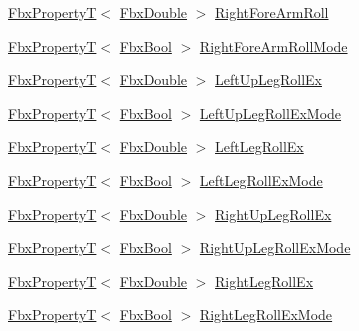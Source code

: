\begin{DoxyCompactItemize}
\item 
\hyperlink{class_fbx_property_t}{Fbx\+PropertyT}$<$ \hyperlink{fbxtypes_8h_a171e72a1c46fc15c1a6c9c31948c1c5b}{Fbx\+Double} $>$ \hyperlink{class_fbx_character_ae212ac3d99f7c69142bb4abc561c1c99}{Right\+Fore\+Arm\+Roll}
\item 
\hyperlink{class_fbx_property_t}{Fbx\+PropertyT}$<$ \hyperlink{fbxtypes_8h_a92e0562b2fe33e76a242f498b362262e}{Fbx\+Bool} $>$ \hyperlink{class_fbx_character_ada8eaa6dbd3161bfbb6a057116364d55}{Right\+Fore\+Arm\+Roll\+Mode}
\item 
\hyperlink{class_fbx_property_t}{Fbx\+PropertyT}$<$ \hyperlink{fbxtypes_8h_a171e72a1c46fc15c1a6c9c31948c1c5b}{Fbx\+Double} $>$ \hyperlink{class_fbx_character_a8e89a70dc082f417658819afb9dc5299}{Left\+Up\+Leg\+Roll\+Ex}
\item 
\hyperlink{class_fbx_property_t}{Fbx\+PropertyT}$<$ \hyperlink{fbxtypes_8h_a92e0562b2fe33e76a242f498b362262e}{Fbx\+Bool} $>$ \hyperlink{class_fbx_character_a4e769bc27457b215a8c2290bb3800b01}{Left\+Up\+Leg\+Roll\+Ex\+Mode}
\item 
\hyperlink{class_fbx_property_t}{Fbx\+PropertyT}$<$ \hyperlink{fbxtypes_8h_a171e72a1c46fc15c1a6c9c31948c1c5b}{Fbx\+Double} $>$ \hyperlink{class_fbx_character_a2af8b40afb59381a80e02b2046997e93}{Left\+Leg\+Roll\+Ex}
\item 
\hyperlink{class_fbx_property_t}{Fbx\+PropertyT}$<$ \hyperlink{fbxtypes_8h_a92e0562b2fe33e76a242f498b362262e}{Fbx\+Bool} $>$ \hyperlink{class_fbx_character_af932f9843a39519efa5d93731e61a601}{Left\+Leg\+Roll\+Ex\+Mode}
\item 
\hyperlink{class_fbx_property_t}{Fbx\+PropertyT}$<$ \hyperlink{fbxtypes_8h_a171e72a1c46fc15c1a6c9c31948c1c5b}{Fbx\+Double} $>$ \hyperlink{class_fbx_character_a5329916e950ff24a4280efc89cf27929}{Right\+Up\+Leg\+Roll\+Ex}
\item 
\hyperlink{class_fbx_property_t}{Fbx\+PropertyT}$<$ \hyperlink{fbxtypes_8h_a92e0562b2fe33e76a242f498b362262e}{Fbx\+Bool} $>$ \hyperlink{class_fbx_character_a30dcd9180563bd919e35f7175cbce100}{Right\+Up\+Leg\+Roll\+Ex\+Mode}
\item 
\hyperlink{class_fbx_property_t}{Fbx\+PropertyT}$<$ \hyperlink{fbxtypes_8h_a171e72a1c46fc15c1a6c9c31948c1c5b}{Fbx\+Double} $>$ \hyperlink{class_fbx_character_a3db8a0efa15b90ce8afe21b454615153}{Right\+Leg\+Roll\+Ex}
\item 
\hyperlink{class_fbx_property_t}{Fbx\+PropertyT}$<$ \hyperlink{fbxtypes_8h_a92e0562b2fe33e76a242f498b362262e}{Fbx\+Bool} $>$ \hyperlink{class_fbx_character_a98fcff118d93fcd5db044179fc3d9487}{Right\+Leg\+Roll\+Ex\+Mode}

\end{DoxyCompactItemize}
